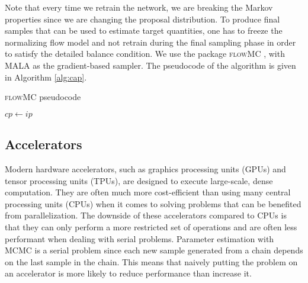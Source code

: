 \documentclass[twocolumn]{aastex631}
\begin{document}
Note that every time we retrain the network, we are breaking the Markov
properties since we are changing the proposal distribution. To produce final
samples that can be used to estimate target quantities, one has to freeze the
normalizing flow model and not retrain during the final sampling phase in order
to satisfy the detailed balance condition. We use the package \textsc{flowMC}
\cite{2022arXiv221106397W,Gabrie:2021tlu}, with MALA as the gradient-based sampler. The
pseudocode of the algorithm is given in Algorithm \ref{alg:cap}.

\begin{algorithm}
\caption{\textsc{flowMC} pseudocode}\label{alg:cap}
$cp \leftarrow ip$\\

\end{algorithm}

\subsection{Accelerators}
\label{sec:accelerators}

Modern hardware accelerators, such as graphics processing units (GPUs) and
tensor processing units (TPUs), are designed to execute large-scale, dense
computation. They are often much more cost-efficient than using many central
processing units (CPUs) when it comes to solving problems that can be benefited
from parallelization.  The downside of these accelerators compared to CPUs is
that they can only perform a more restricted set of operations and are often
less performant when dealing with serial problems. Parameter estimation with
MCMC is a serial problem since each new sample generated from a chain depends
on the last sample in the chain. This means that naively putting the problem on
an accelerator is more likely to reduce performance than increase it.
\end{document}
